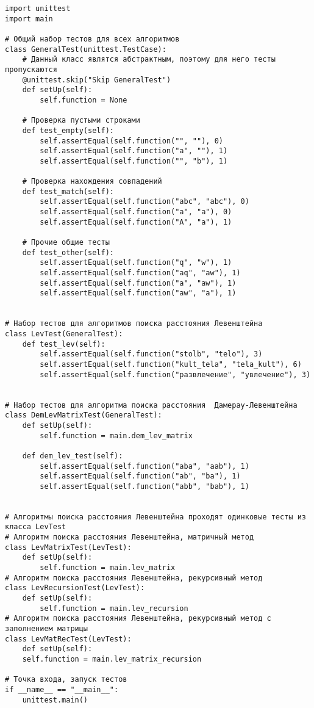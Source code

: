 \begin{lstlisting}[caption = Модульные тесты]
import unittest
import main

# Общий набор тестов для всех алгоритмов
class GeneralTest(unittest.TestCase):
	# Данный класс являтся абстрактным, поэтому для него тесты пропускаются
	@unittest.skip("Skip GeneralTest")
	def setUp(self):
		self.function = None
	
	# Проверка пустыми строками
	def test_empty(self):
		self.assertEqual(self.function("", ""), 0)
		self.assertEqual(self.function("a", ""), 1)
		self.assertEqual(self.function("", "b"), 1)
		
	# Проверка нахождения совпадений
	def test_match(self):
		self.assertEqual(self.function("abc", "abc"), 0)
		self.assertEqual(self.function("a", "a"), 0)
		self.assertEqual(self.function("A", "a"), 1)
	
	# Прочие общие тесты
	def test_other(self):
		self.assertEqual(self.function("q", "w"), 1)
		self.assertEqual(self.function("aq", "aw"), 1)
		self.assertEqual(self.function("a", "aw"), 1)
		self.assertEqual(self.function("aw", "a"), 1)


# Набор тестов для алгоритмов поиска расстояния Левенштейна
class LevTest(GeneralTest):
	def test_lev(self):
		self.assertEqual(self.function("stolb", "telo"), 3)
		self.assertEqual(self.function("kult_tela", "tela_kult"), 6)
		self.assertEqual(self.function("развлечение", "увлечение"), 3)


# Набор тестов для алгоритма поиска расстояния  Дамерау-Левенштейна
class DemLevMatrixTest(GeneralTest):
	def setUp(self):
		self.function = main.dem_lev_matrix

	def dem_lev_test(self):
		self.assertEqual(self.function("aba", "aab"), 1)
		self.assertEqual(self.function("ab", "ba"), 1)
		self.assertEqual(self.function("abb", "bab"), 1)


# Алгоритмы поиска расстояния Левенштейна проходят одинковые тесты из класса LevTest
# Алгоритм поиска расстояния Левенштейна, матричный метод
class LevMatrixTest(LevTest):
	def setUp(self):
		self.function = main.lev_matrix
# Алгоритм поиска расстояния Левенштейна, рекурсивный метод
class LevRecursionTest(LevTest):
	def setUp(self):
		self.function = main.lev_recursion
# Алгоритм поиска расстояния Левенштейна, рекурсивный метод с заполнением матрицы
class LevMatRecTest(LevTest):
	def setUp(self):
	self.function = main.lev_matrix_recursion

# Точка входа, запуск тестов
if __name__ == "__main__":
	unittest.main()
\end{lstlisting}

